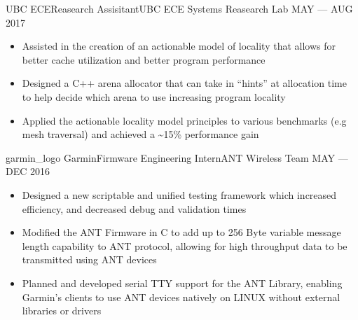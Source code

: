 \begin{experiences}
  \emptySeparator

    {UBC ECE}{Reasearch Assisitant}{UBC ECE Systems Reasearch Lab}
    {MAY --- AUG 2017}{
      \begin{itemize}
        \item Assisted in the creation of an actionable model of locality that allows for better
              cache utilization and better program performance
        \item Designed a C++ arena allocator that can take in “hints” at allocation time to help
              decide which arena to use increasing program locality
        \item Applied the actionable locality model principles to various benchmarks
              (e.g mesh traversal) and achieved a \~{}15\% performance gain
      \end{itemize}
    }
  \emptySeparator
  \experience
    {garmin_logo}
    {Garmin}{Firmware Engineering Intern}{ANT Wireless Team}
    {MAY --- DEC 2016}
    {
      \begin{itemize}
        \item Designed a new scriptable and unified testing framework which increased efficiency,
              and decreased debug and validation times
        \item Modified the ANT Firmware in C to add up to 256 Byte variable message length
              capability to ANT protocol, allowing for high throughput data to be transmitted using
              ANT devices
        \item Planned and developed serial TTY support for the ANT Library, enabling Garmin’s
              clients to use ANT devices natively on LINUX without external libraries or drivers
      \end{itemize}
    }

  \emptySeparator
\end{experiences}
